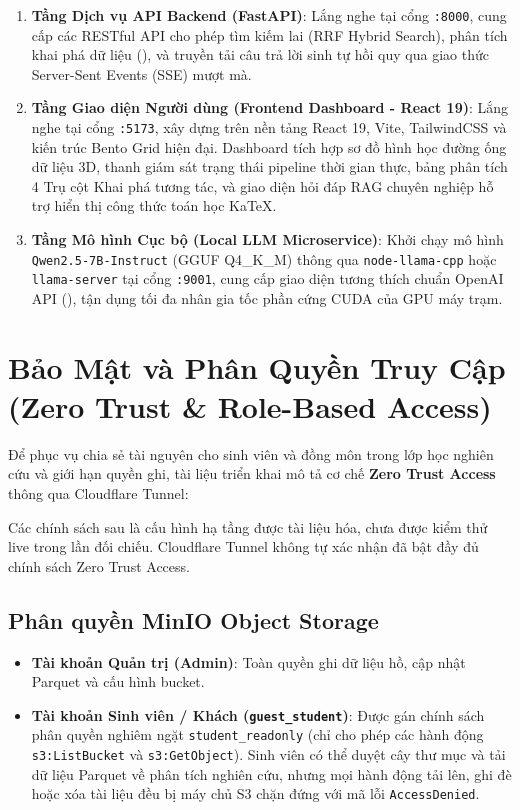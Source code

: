 \begin{enumerate}[label=\textbf{\arabic*.}]
  \item \textbf{Tầng Dịch vụ API Backend (FastAPI)}:
    Lắng nghe tại cổng \texttt{:8000}, cung cấp các RESTful API cho phép tìm kiếm lai (RRF Hybrid Search), phân tích khai phá dữ liệu (), và truyền tải câu trả lời sinh tự hồi quy qua giao thức Server-Sent Events (SSE) mượt mà.
  \item \textbf{Tầng Giao diện Người dùng (Frontend Dashboard - React 19)}:
    Lắng nghe tại cổng \texttt{:5173}, xây dựng trên nền tảng React 19, Vite, TailwindCSS và kiến trúc Bento Grid hiện đại. Dashboard tích hợp sơ đồ hình học đường ống dữ liệu 3D, thanh giám sát trạng thái pipeline thời gian thực, bảng phân tích 4 Trụ cột Khai phá tương tác, và giao diện hỏi đáp RAG chuyên nghiệp hỗ trợ hiển thị công thức toán học KaTeX.
  \item \textbf{Tầng Mô hình Cục bộ (Local LLM Microservice)}:
    Khởi chạy mô hình \texttt{Qwen2.5-7B-Instruct} (GGUF Q4\_K\_M) thông qua \texttt{node-llama-cpp} hoặc \texttt{llama-server} tại cổng \texttt{:9001}, cung cấp giao diện tương thích chuẩn OpenAI API (), tận dụng tối đa nhân gia tốc phần cứng CUDA của GPU máy trạm.
\end{enumerate}

\section{Bảo Mật và Phân Quyền Truy Cập (Zero Trust \& Role-Based Access)}

Để phục vụ chia sẻ tài nguyên cho sinh viên và đồng môn trong lớp học nghiên cứu và giới hạn quyền ghi, tài liệu triển khai mô tả cơ chế \textbf{Zero Trust Access} thông qua Cloudflare Tunnel:

Các chính sách sau là cấu hình hạ tầng được tài liệu hóa, chưa được kiểm thử live trong lần đối chiếu. Cloudflare Tunnel không tự xác nhận đã bật đầy đủ chính sách Zero Trust Access.
\subsection{Phân quyền MinIO Object Storage}
\begin{itemize}
  \item \textbf{Tài khoản Quản trị (Admin)}: Toàn quyền ghi dữ liệu hồ, cập nhật Parquet và cấu hình bucket.
  \item \textbf{Tài khoản Sinh viên / Khách (\texttt{guest\_student})}: Được gán chính sách phân quyền nghiêm ngặt \lstinline{student_readonly} (chỉ cho phép các hành động \texttt{s3:ListBucket} và \texttt{s3:GetObject}). Sinh viên có thể duyệt cây thư mục và tải dữ liệu Parquet về phân tích nghiên cứu, nhưng mọi hành động tải lên, ghi đè hoặc xóa tài liệu đều bị máy chủ S3 chặn đứng với mã lỗi \texttt{AccessDenied}.
\end{itemize}

